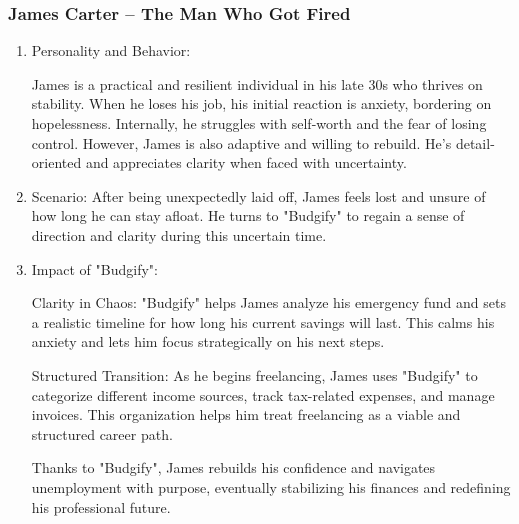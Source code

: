 \documentclass[a4paper,12pt]{article}
\begin{document}
\subsubsection{James Carter – The Man Who Got Fired}
\begin{enumerate}
    \item Personality and Behavior:
    
    James is a practical and resilient individual in his late 30s who thrives on stability. When he loses his job, his initial reaction is anxiety, bordering on hopelessness. Internally, he struggles with self-worth and the fear of losing control. However, James is also adaptive and willing to rebuild. He's detail-oriented and appreciates clarity when faced with uncertainty.
    
    \item Scenario:
    After being unexpectedly laid off, James feels lost and unsure of how long he can stay afloat. He turns to "Budgify" to regain a sense of direction and clarity during this uncertain time.
    
    \item Impact of "Budgify":
    
    Clarity in Chaos: "Budgify" helps James analyze his emergency fund and sets a realistic timeline for how long his current savings will last. This calms his anxiety and lets him focus strategically on his next steps.
    
    Structured Transition: As he begins freelancing, James uses "Budgify" to categorize different income sources, track tax-related expenses, and manage invoices. This organization helps him treat freelancing as a viable and structured career path.
    
    Thanks to "Budgify", James rebuilds his confidence and navigates unemployment with purpose, eventually stabilizing his finances and redefining his professional future.

\end{enumerate}
\end{document}

